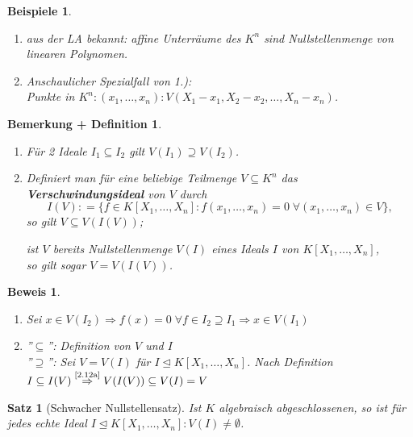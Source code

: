 \documentclass[a4paper,12pt]{scrbook}
\theoremstyle{break}
\newtheorem{BemDef}[Def]{Bemerkung + Definition}
\theoremstyle{nonumberbreak}
\newtheorem{Bew}{Beweis}
\newtheorem{nnBsp}{Beispiele}
\newtheorem{nnSatz}{Satz}
\theoremstyle{nonumberplain}
\newcommand{\emp}[1]{\textbf{\emph{#1}}}
\newcommand{\defeqr}[0]{\mathrel{\mathop:}=}
\begin{document}
\begin{nnBsp} 
  \begin{enumerate}
    \item[1.)] aus der LA bekannt: affine Unterräume des $K^n$ sind
               Nullstellenmenge von linearen Polynomen.
    \item[2.)] Anschaulicher Spezialfall von 1.):\\
               Punkte in $K^n: (x_1, \dots, x_n): V(X_1-x_1, X_2 - x_2, \dots,
               X_n - x_n)$.
  \end{enumerate}
\end{nnBsp}

\begin{BemDef}
  \begin{enumerate}
    \item \label{2.12a}Für 2 Ideale $I_1 \subseteq I_2$ gilt $V(I_1) \supseteq V(I_2)$.
    \item Definiert man für eine beliebige Teilmenge $V \subseteq K^n$ das
      \emp{Verschwindungsideal} von $V$ durch
      $$I(V) \defeqr \{ f \in K[X_1,\dots, X_n]: f(x_1, \dots, x_n) = 0 \; \forall (x_1, \dots, x_n) \in V\},$$
      so gilt $V \subseteq V(I(V))$;

      ist $V$ bereits Nullstellenmenge $V(I)$ eines Ideals $I$ von $K[X_1, \dots, X_n]$,\\
      so gilt sogar $V = V(I(V))$.
  \end{enumerate}
\end{BemDef}

\begin{Bew}
  \begin{enumerate}
    \item Sei $x \in V(I_2) \Rightarrow f(x) = 0 \; \forall f \in I_2 \supseteq I_1 \Rightarrow x \in V(I_1)$
    \item ''$\subseteq$'': Definition von $V$ und $I$\\
          ''$\supseteq$'': Sei $V = V(I)$ für $I \trianglelefteq K[X_1, \dots, X_n]$.
	  Nach Definition $I \subseteq I(V) \overset{\text{\ref{2.12a}}}{\Rightarrow} V(I(V)) \subseteq V(I) = V$
  \end{enumerate}
\end{Bew}

\begin{nnSatz}[Schwacher Nullstellensatz]
\label{SatzSchwach}
  Ist $K$ algebraisch abgeschlossenen, so ist für jedes echte Ideal $I \trianglelefteq K[X_1, \dots, X_n]: V(I) \not= \emptyset$.
\end{nnSatz}
\end{document}
